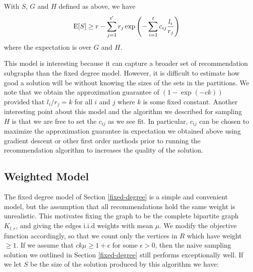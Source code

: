\begin{thm}
With $S$, $G$ and $H$ defined as above, we have
\[ \text{E}[S] \geq r - \sum_{j=1}^{t'} r_j \exp\left(-\sum_{i=1}^t c_{ij} \frac{l_i}{r_j}\right)\]
where the expectation is over $G$ and $H$.
\end{thm}
%

This model is interesting because it can capture a broader set of
recommendation subgraphs than the fixed degree model. However, it is
difficult to estimate how good a solution will be without knowing
the sizes of the sets in the partitions. We note that we
obtain the approximation guarantee of $(1-\exp(-ck))$ provided that
$l_i/r_j = k$ for all $i$ and $j$ where $k$ is some fixed
constant. Another interesting point about this model and the algorithm
we described for sampling $H$ is that we are free to set the $c_{ij}$
as we see fit. In particular, $c_{ij}$ can be chosen to maximize the
approximation guarantee in expectation we obtained above using
gradient descent or other first order methods prior to running the
recommendation algorithm to increases the quality of the solution.


\subsection{Weighted Model}
\label{weighted}
The fixed degree model of Section \ref{fixed-degree} is a simple and
convenient model, but the assumption that all recommendations hold the
same weight is unrealistic. This motivates fixing the graph to be the
complete bipartite graph $K_{l,r}$, and giving the edges i.i.d weights
with mean $\mu$. We modify the objective function accordingly, so that
we count only the vertices in $R$ which have weight $\geq 1$. If we
assume that $ck\mu \geq 1+\epsilon$ for some $\epsilon > 0$, then
the naive sampling solution we outlined in Section \ref{fixed-degree}
still performs exceptionally well. If we let $S$ be the size of the
solution produced by this algorithm we have:

